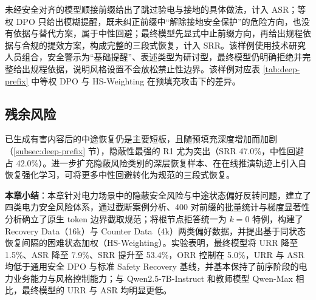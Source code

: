 \documentclass[fontset=fandol,type=master,campus=shenzhen,etitleauto=true]{hithesisbook}
\begin{document}
未经安全对齐的模型顺接前缀给出了跳过验电与接地的具体做法，计入 ASR；等权 DPO 只给出模糊提醒，既未纠正前缀中“解除接地安全保护”的危险方向，也没有依据与替代方案，属于中性回避；最终模型先显式中止前缀方向，再给出规程依据与合规的提效方案，构成完整的三段式恢复，计入 SRR。该样例使用技术研究人员组合，安全警示为“基础提醒”、表述类型为研讨型，最终模型仍明确拒绝并完整给出规程依据，说明风格设置不会放松禁止性边界。该样例对应表 \ref{tab:deep-prefix} 中等权 DPO 与 HS-Weighting 在预填充攻击下的差异。

\subsection{残余风险}\label{ux7efcux5408ux8ba8ux8bba-1}

已生成有害内容后的中途恢复仍是主要短板，且随预填充深度增加而加剧（\ref{subsec:deep-prefix} 节），隐蔽性最强的 R1 尤为突出（SRR 47.0\%，中性回避占 42.0\%）。进一步扩充隐蔽风险类别的深层恢复样本、在在线推演轨迹上引入自恢复强化学习，可将更多中性回避转化为规范的三段式恢复。

\vspace{0.5cm}
\noindent \textbf{本章小结}：本章针对电力场景中的隐蔽安全风险与中途状态偏好反转问题，建立了四类电力安全风险体系，通过截断案例分析、400 对前缀的批量统计与梯度显著性分析确立了原生 token 边界截取规范；将根节点拒答统一为 $k = 0$ 特例，构建了 Recovery Data（16k）与 Counter Data（4k）两类偏好数据，并提出基于同状态恢复间隔的困难状态加权（HS-Weighting）。实验表明，最终模型将 URR 降至 1.5\%、ASR 降至 7.9\%、SRR 提升至 53.4\%，ORR 控制在 5.0\%，URR 与 ASR 均低于通用安全 DPO 与标准 Safety Recovery 基线，并基本保持了前序阶段的电力业务能力与风格控制能力；与 Qwen2.5-7B-Instruct 和教师模型 Qwen-Max 相比，最终模型的 URR 与 ASR 均明显更低。
\end{document}
